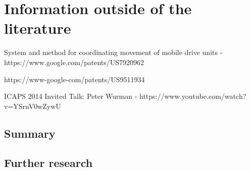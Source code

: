 \documentclass[a4paper,11pt]{article}
\begin{document}
\section{Information outside of the literature}
System and method for coordinating movement of mobile drive units  - https://www.google.com/patents/US7920962

https://www-google-com/patents/US9511934

ICAPS 2014 Invited Talk: Peter Wurman - https://www.youtube.com/watch?v=YSrnV0wZywU

\subsection{Summary}


\subsection{Further research}




\end{document}
